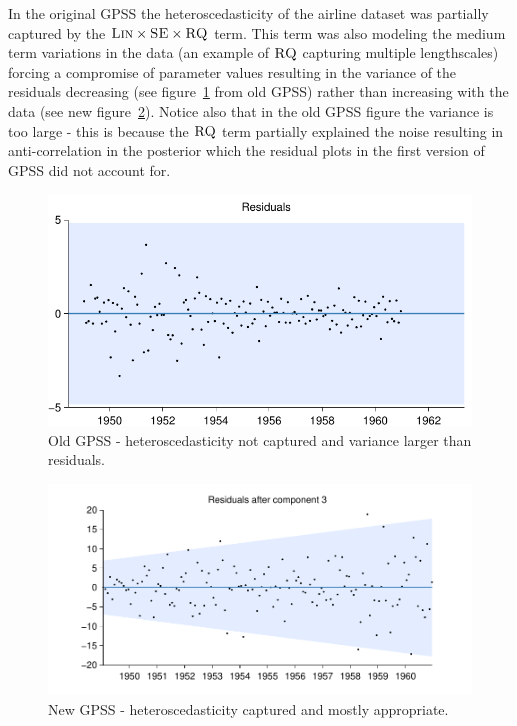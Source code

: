 \documentclass{article}
\begin{document}
In the original GPSS the heteroscedasticity of the airline dataset was partially captured by the ${\textsc{Lin}} \times {\textsc{SE}} \times {\textsc{RQ}}$ term.
This term was also modeling the medium term variations in the data (an example of ${\textsc{RQ}}$ capturing multiple lengthscales) forcing a compromise of parameter values resulting in the variance of the residuals decreasing (see figure~\ref{fig:not_hetero} from old GPSS) rather than increasing with the data (see new figure~\ref{fig:hetero}).
Notice also that in the old GPSS figure the variance is too large - this is because the ${\textsc{RQ}}$ term partially explained the noise resulting in anti-correlation in the posterior which the residual plots in the first version of GPSS did not account for.

\begin{figure}[h]
\centering
\includegraphics[width=0.98\columnwidth]{figures/old-gpss/01-airline-months_resid}
\caption{Old GPSS - heteroscedasticity not captured and variance larger than residuals.}
\label{fig:not_hetero}
\end{figure}

\begin{figure}[h]
\centering
\includegraphics[width=0.98\columnwidth]{figures/01-airline/01-airline_3_anti_cum}
\caption{New GPSS - heteroscedasticity captured and mostly appropriate.}
\label{fig:hetero}
\end{figure}
\end{document}
